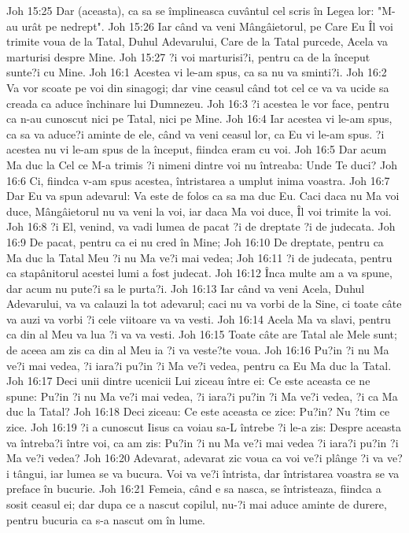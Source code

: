 Joh 15:25  Dar (aceasta), ca sa se împlineasca cuvântul cel scris în Legea lor: "M-au urât pe nedrept".
Joh 15:26  Iar când va veni Mângâietorul, pe Care Eu Îl voi trimite voua de la Tatal, Duhul Adevarului, Care de la Tatal purcede, Acela va marturisi despre Mine.
Joh 15:27  ?i voi marturisi?i, pentru ca de la început sunte?i cu Mine.
Joh 16:1  Acestea vi le-am spus, ca sa nu va sminti?i.
Joh 16:2  Va vor scoate pe voi din sinagogi; dar vine ceasul când tot cel ce va va ucide sa creada ca aduce închinare lui Dumnezeu.
Joh 16:3  ?i acestea le vor face, pentru ca n-au cunoscut nici pe Tatal, nici pe Mine.
Joh 16:4  Iar acestea vi le-am spus, ca sa va aduce?i aminte de ele, când va veni ceasul lor, ca Eu vi le-am spus. ?i acestea nu vi le-am spus de la început, fiindca eram cu voi.
Joh 16:5  Dar acum Ma duc la Cel ce M-a trimis ?i nimeni dintre voi nu întreaba: Unde Te duci?
Joh 16:6  Ci, fiindca v-am spus acestea, întristarea a umplut inima voastra.
Joh 16:7  Dar Eu va spun adevarul: Va este de folos ca sa ma duc Eu. Caci daca nu Ma voi duce, Mângâietorul nu va veni la voi, iar daca Ma voi duce, Îl voi trimite la voi.
Joh 16:8  ?i El, venind, va vadi lumea de pacat ?i de dreptate ?i de judecata.
Joh 16:9  De pacat, pentru ca ei nu cred în Mine;
Joh 16:10  De dreptate, pentru ca Ma duc la Tatal Meu ?i nu Ma ve?i mai vedea;
Joh 16:11  ?i de judecata, pentru ca stapânitorul acestei lumi a fost judecat.
Joh 16:12  Înca multe am a va spune, dar acum nu pute?i sa le purta?i.
Joh 16:13  Iar când va veni Acela, Duhul Adevarului, va va calauzi la tot adevarul; caci nu va vorbi de la Sine, ci toate câte va auzi va vorbi ?i cele viitoare va va vesti.
Joh 16:14  Acela Ma va slavi, pentru ca din al Meu va lua ?i va va vesti.
Joh 16:15  Toate câte are Tatal ale Mele sunt; de aceea am zis ca din al Meu ia ?i va veste?te voua.
Joh 16:16  Pu?in ?i nu Ma ve?i mai vedea, ?i iara?i pu?in ?i Ma ve?i vedea, pentru ca Eu Ma duc la Tatal.
Joh 16:17  Deci unii dintre ucenicii Lui ziceau între ei: Ce este aceasta ce ne spune: Pu?in ?i nu Ma ve?i mai vedea, ?i iara?i pu?in ?i Ma ve?i vedea, ?i ca Ma duc la Tatal?
Joh 16:18  Deci ziceau: Ce este aceasta ce zice: Pu?in? Nu ?tim ce zice.
Joh 16:19  ?i a cunoscut Iisus ca voiau sa-L întrebe ?i le-a zis: Despre aceasta va întreba?i între voi, ca am zis: Pu?in ?i nu Ma ve?i mai vedea ?i iara?i pu?in ?i Ma ve?i vedea?
Joh 16:20  Adevarat, adevarat zic voua ca voi ve?i plânge ?i va ve?i tângui, iar lumea se va bucura. Voi va ve?i întrista, dar întristarea voastra se va preface în bucurie.
Joh 16:21  Femeia, când e sa nasca, se întristeaza, fiindca a sosit ceasul ei; dar dupa ce a nascut copilul, nu-?i mai aduce aminte de durere, pentru bucuria ca s-a nascut om în lume.
